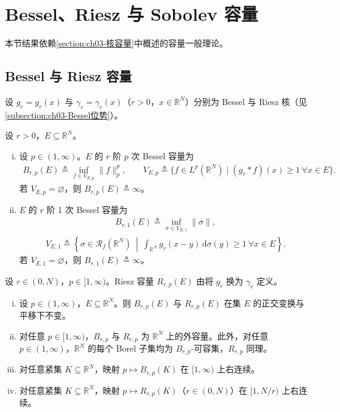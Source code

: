 \documentclass[../../main.tex]{subfiles}%
\begin{document}
\section{Bessel、Riesz 与 Sobolev 容量}\label{section:ch03-特殊容量}

本节结果依赖\cref{section:ch03-核容量}中概述的容量一般理论。

\subsection{Bessel 与 Riesz 容量}\label{subsection:ch03-BesselRiesz}

设 $g_r=g_r(x)$ 与 $\gamma_r=\gamma_r(x)$（$r>0$，$x\in\mathbb{R}^N$）分别为 Bessel 与 Riesz 核（见\cref{subsection:ch03-Bessel位势}）。

\begin{definition}\label{definition:ch03-Bessel容量}
设 $r>0$，$E\subseteq\mathbb{R}^N$。
\begin{enumerate}[(i)]
\item 设 $p\in(1,\infty)$。$E$ 的 $r$ 阶 $p$ 次 Bessel 容量为
\begin{align}
B_{r,p}(E)\triangleq \inf_{f\in V_{E,p}}\|f\|_p^p,\qquad
V_{E,p}\triangleq \{f\in L^p(\mathbb{R}^N)\mid (g_r*f)(x)\geqslant1\ \forall x\in E\}.\label{align:ch03-3.48}
\end{align}
若 $V_{E,p}=\varnothing $，则 $B_{r,p}(E)\triangleq \infty$。
\item $E$ 的 $r$ 阶 1 次 Bessel 容量为
\begin{align}
B_{r,1}(E)\triangleq \inf_{\sigma\in V_{E,1}}\|\sigma\|,\label{align:ch03-3.49a}
\end{align}
\begin{align}
V_{E,1}\triangleq \left\{\sigma\in\mathscr{R}_f(\mathbb{R}^N)\ \middle|\ \int_{\mathbb{R}^N}g_r(x-y)\,\mathrm{d}\sigma(y)\geqslant1\ \forall x\in E\right\}.\label{align:ch03-3.49b}
\end{align}
若 $V_{E,1}=\varnothing $，则 $B_{r,1}(E)\triangleq \infty$。
\end{enumerate}

设 $r\in(0,N)$，$p\in[1,\infty)$。Riesz 容量 $R_{r,p}(E)$ 由将 $g_r$ 换为 $\gamma_r$ 定义。
\end{definition}

\begin{proposition}\label{proposition:ch03-Bessel基本}
\begin{enumerate}[(i)]
\item 设 $p\in(1,\infty)$，$E\subseteq\mathbb{R}^N$。则 $B_{r,p}(E)$ 与 $R_{r,p}(E)$ 在集 $E$ 的正交变换与平移下不变。
\item 对任意 $p\in[1,\infty)$，$B_{r,p}$ 与 $R_{r,p}$ 为 $\mathbb{R}^N$ 上的外容量。此外，对任意 $p\in(1,\infty)$，$\mathbb{R}^N$ 的每个 Borel 子集均为 $B_{r,p}$-可容集，$R_{r,p}$ 同理。
\item 对任意紧集 $K\subseteq\mathbb{R}^N$，映射 $p\mapsto B_{r,p}(K)$ 在 $[1,\infty)$ 上右连续。
\item 对任意紧集 $K\subseteq\mathbb{R}^N$，映射 $p\mapsto R_{r,p}(K)$（$r\in(0,N)$）在 $[1,N/r)$ 上右连续。
\end{enumerate}
\end{proposition}
\end{document}
